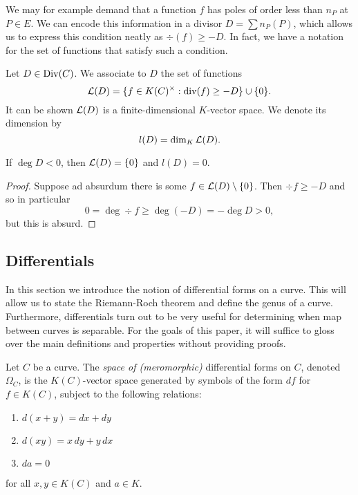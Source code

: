 We may for example demand that a function $f$
has poles of order less than $n_P$ at $P \in E$.
We can encode this information in a divisor $D = \sum n_P(P)$,
which allows us to express this condition neatly as
$\div(f) \geq -D$. In fact, we have a notation for the set
of functions that satisfy such a condition.

\begin{definition}
	Let $D \in \operatorname{Div}(C)$. We associate to $D$ the set of functions
	\begin{equation*}
		\mathcal{L}(D) = \{f \in K(C)^\times: \operatorname{div}(f) \geq -D\} \cup \{ 0 \}.
	\end{equation*}
	It can be shown $\mathcal{L}(D)$ is a finite-dimensional
	$K$-vector space. We denote its dimension by
	\begin{equation*}
		l(D) = \dim_K \mathcal{L}(D).
	\end{equation*}
\end{definition}

\begin{proposition}
	\label{prop:L-prop}
	If $\deg D < 0$, then $\mathcal{L}(D) = \{0\}$ and $l(D) = 0$.
\end{proposition}

\begin{proof}
	Suppose ad absurdum there is some $f \in \mathcal{L}(D) \setminus \{0\}$.
	Then $\div f \geq -D$ and so in particular
	\begin{equation*}
		0 = \deg \div f \geq \deg(-D) = -\deg D > 0,
	\end{equation*}
	but this is absurd.
\end{proof}

\subsection{Differentials}

In this section we introduce the notion of differential forms on a curve.
This will allow us to state the Riemann-Roch theorem and define the genus of a
curve. Furthermore, differentials turn out to be very useful for determining
when map between curves is separable.
For the goals of this paper, it will suffice to gloss over the main definitions
and properties without providing proofs.

\begin{definition}
	Let $C$ be a curve. 
	The \emph{space of (meromorphic)} differential forms on $C$, denoted
	$\Omega_C$, is the $K(C)$-vector space generated by symbols of the form
	$df$ for $f\in K(C)$, subject to the following relations:
	\begin{enumerate}[itemsep=0em]
		\item $d(x + y) = dx + dy$
		\item $d(xy) = x\,dy + y\,dx$
		\item $da = 0$
	\end{enumerate}
	for all $x, y \in K(C)$ and $a \in K$.
\end{definition}

